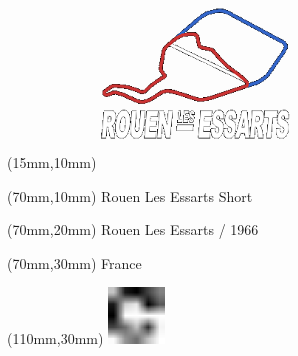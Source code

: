\null\newpage
\begin{textblock*}{50mm}(15mm,10mm)%
\includegraphics[width=50mm]{LG/ROU.png}
\end{textblock*}
\begin{textblock*}{130mm}(70mm,10mm)%
{\fontsize{20}{20}\selectfont Rouen Les Essarts Short}\\
\end{textblock*}
\begin{textblock*}{120mm}(70mm,20mm)%
{\fontsize{16}{16}\selectfont Rouen Les Essarts / 1966}\\
\end{textblock*}
\begin{textblock*}{120mm}(70mm,30mm)%
{\fontsize{12}{12}\selectfont France}
\end{textblock*}
\begin{textblock*}{30mm}(110mm,30mm)%
\centering
\includegraphics[height=15mm]{icons/fa-rotate-right.pdf}
\end{textblock*}
